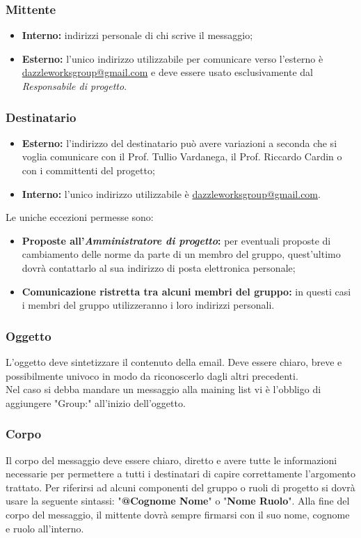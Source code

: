 		\subsubsection{Mittente}
\begin{itemize}
	\item \textbf{Interno:} indirizzi personale di chi scrive il messaggio;
	\item \textbf{Esterno:} l'unico indirizzo utilizzabile per comunicare verso l'esterno è \url{dazzleworksgroup@gmail.com} e deve essere usato esclusivamente dal \textit{Responsabile di progetto}.
\end{itemize}
	\subsubsection{Destinatario}
\begin{itemize}
	\item \textbf{Esterno:} l'indirizzo del destinatario può avere variazioni a seconda che si voglia comunicare con il Prof. Tullio Vardanega, il Prof. Riccardo Cardin o con i committenti del progetto;
	\item \textbf{Interno:} l'unico indirizzo utilizzabile è \url{dazzleworksgroup@gmail.com}.
\end{itemize}
Le uniche eccezioni permesse sono:
\begin{itemize}
	\item \textbf{Proposte all'\textit{Amministratore di progetto}:} per eventuali proposte di cambiamento delle norme da parte di un membro del gruppo, quest'ultimo dovrà contattarlo al sua indirizzo di posta elettronica personale;
	\item \textbf{Comunicazione ristretta tra alcuni membri del gruppo:} in questi casi i membri del gruppo utilizzeranno i loro indirizzi personali.
\end{itemize}

		\subsubsection{Oggetto}
L'oggetto deve sintetizzare il contenuto della email. Deve essere chiaro, breve e possibilmente univoco in modo da riconoscerlo dagli altri precedenti.\\
Nel caso si debba mandare un messaggio alla \gls{maining list} vi è l'obbligo di aggiungere "Group:" all'inizio dell'oggetto.
		\subsubsection{Corpo}
Il corpo del messaggio deve essere chiaro, diretto e avere tutte le informazioni necessarie per permettere a tutti i destinatari di capire correttamente l'argomento trattato. Per riferirsi ad alcuni componenti del gruppo o ruoli di progetto si dovrà usare la seguente sintassi: "\textbf{@Cognome Nome}" o "\textbf{Nome Ruolo}". Alla fine del corpo del messaggio, il mittente dovrà sempre firmarsi con il suo nome, cognome e ruolo all'interno.
